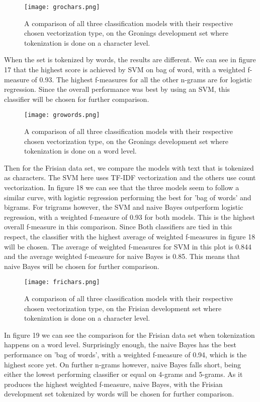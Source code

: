 \documentclass[
10pt, %
a4paper, %
oneside, %
headinclude,footinclude, %
] {book}%
\begin{document}
\begin{figure}[H]
  \texttt{[image: grochars.png]}
  \caption{A comparison of all three classification models with their respective chosen vectorization type, on the Gronings development set where tokenization is done on a character level.}
\end{figure} 

When the set is tokenized by words, the results are different. We can see in figure 17 that the highest score is achieved by SVM on bag of word, with a weighted f-measure of 0.93. The highest f-measures for all the other n-grams are for logistic regression. Since the overall performance was best by using an SVM, this classifier will be chosen for further comparison.

\begin{figure}[H]
  \texttt{[image: growords.png]}
  \caption{A comparison of all three classification models with their respective chosen vectorization type, on the Gronings development set where tokenization is done on a word level.}
\end{figure}

Then for the Frisian data set, we compare the models with text that is tokenized as characters. The SVM here uses TF-IDF vectorization and the others use count vectorization.  In figure 18 we can see that the three models seem to follow a similar curve, with logistic regression performing the best for 'bag of words' and bigrams. For trigrams however, the SVM and naive Bayes outperform logistic regression, with a weighted f-measure of 0.93 for both models. This is the highest overall f-measure in this comparison. Since Both classifiers are tied in this respect, the classifier with the highest average of weighted f-measures in figure 18 will be chosen. The average of weighted f-measures for SVM in this plot is 0.844 and the average weighted f-measure for naive Bayes is 0.85. This means that naive Bayes will be chosen for further comparison.

\begin{figure}[H]
  \texttt{[image: frichars.png]}
  \caption{A comparison of all three classification models with their respective chosen vectorization type, on the Frisian development set where tokenization is done on a character level.}
\end{figure} 

In figure 19 we can see the comparison for the Frisian data set when tokenization happens on a word level. Surprisingly enough, the naive Bayes has the best performance on 'bag of words', with a weighted f-measure of 0.94, which is the highest score yet. On further n-grams however, naive Bayes falls short, being either the lowest performing classifier or equal on 4-grams and 5-grams. As it produces the highest weighted f-measure, naive Bayes, with the Frisian development set tokenized by words will be chosen for further comparison.
\end{document}
